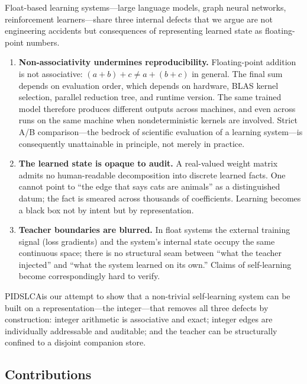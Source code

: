 \documentclass[11pt,a4paper]{article}
\newcommand{\sysname}{PIDSLCA}
\begin{document}
Float-based learning systems---large language models, graph neural
networks, reinforcement learners---share three internal defects that we
argue are not engineering accidents but consequences of representing
learned state as floating-point numbers.

\begin{enumerate}[leftmargin=*]
\item \textbf{Non-associativity undermines reproducibility.} Floating-point
addition is not associative: $(a+b)+c \neq a+(b+c)$ in general. The final
sum depends on evaluation order, which depends on hardware, BLAS kernel
selection, parallel reduction tree, and runtime version. The same trained
model therefore produces different outputs across machines, and even
across runs on the same machine when nondeterministic kernels are
involved. Strict A/B comparison---the bedrock of scientific evaluation of
a learning system---is consequently unattainable in principle, not merely
in practice.

\item \textbf{The learned state is opaque to audit.} A real-valued weight
matrix admits no human-readable decomposition into discrete learned
facts. One cannot point to ``the edge that says cats are animals'' as a
distinguished datum; the fact is smeared across thousands of coefficients.
Learning becomes a black box not by intent but by representation.

\item \textbf{Teacher boundaries are blurred.} In float systems the
external training signal (loss gradients) and the system's internal state
occupy the same continuous space; there is no structural seam between
``what the teacher injected'' and ``what the system learned on its own.''
Claims of self-learning become correspondingly hard to verify.
\end{enumerate}

\sysname is our attempt to show that a non-trivial self-learning system
can be built on a representation---the integer---that removes all three
defects by construction: integer arithmetic is associative and exact;
integer edges are individually addressable and auditable; and the teacher
can be structurally confined to a disjoint
companion store.

\subsection{Contributions}
\label{sec:intro-contrib}
\end{document}

